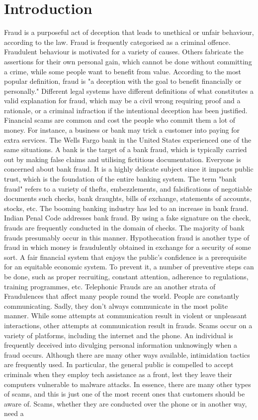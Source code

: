 \documentclass[sn-mathphys]{sn-jnl}%
\theoremstyle{thmstyleone}%
\theoremstyle{thmstyletwo}%
\theoremstyle{thmstylethree}%
\begin{document}
\section{Introduction}
Fraud is a purposeful act of deception that leads to unethical or unfair behaviour, according to the law. Fraud is frequently categorised as a criminal offence. Fraudulent behaviour is motivated for a variety of causes. Others fabricate the assertions for their own personal gain, which cannot be done without committing a crime, while some people want to benefit from value.  According to the most popular definition, fraud is "a deception with the goal to benefit financially or personally." Different legal systems have different definitions of what constitutes a valid explanation for fraud, which may be a civil wrong requiring proof and a rationale, or a criminal infraction if the intentional deception has been justified. Financial scams are common and cost the people who commit them a lot of money. For instance, a business or bank may trick a customer into paying for extra services. The Wells Fargo bank in the United States experienced one of the same situations. A bank is the target of a bank fraud, which is typically carried out by making false claims and utilising fictitious documentation. Everyone is concerned about bank fraud. It is a highly delicate subject since it impacts public trust, which is the foundation of the entire banking system. The term "bank fraud" refers to a variety of thefts, embezzlements, and falsifications of negotiable documents such checks, bank draughts, bills of exchange, statements of accounts, stocks, etc. The booming banking industry has led to an increase in bank fraud. Indian Penal Code addresses bank fraud. By using a fake signature on the check, frauds are frequently conducted in the domain of checks. The majority of bank frauds presumably occur in this manner. Hypothecation fraud is another type of fraud in which money is fraudulently obtained in exchange for a security of some sort. A fair financial system that enjoys the public's confidence is a prerequisite for an equitable economic system. To prevent it, a number of preventive steps can be done, such as proper recruiting, constant attention, adherence to regulations, training programmes, etc. Telephonic Frauds are an another strata of Fraudulences that affect many people round the world. People are constantly communicating. Sadly, they don't always communicate in the most polite manner. While some attempts at communication result in violent or unpleasant interactions, other attempts at communication result in frauds. Scams occur on a variety of platforms, including the internet and the phone. An individual is frequently deceived into divulging personal information unknowingly when a fraud occurs. Although there are many other ways available, intimidation tactics are frequently used. In particular, the general public is compelled to accept criminals when they employ tech assistance as a front, lest they leave their computers vulnerable to malware attacks. In essence, there are many other types of scams, and this is just one of the most recent ones that customers should be aware of. Scams, whether they are conducted over the phone or in another way, need a 
\end{document}
